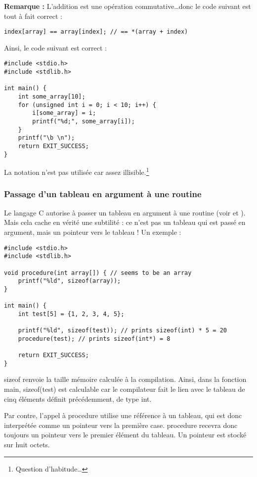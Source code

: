 \documentclass[../../../main.tex]{subfiles}
\begin{document}
\textbf{Remarque :} L'addition est une opération commutative\dots donc le code suivant est tout à fait correct :
\begin{verbatim}
index[array] == array[index]; // == *(array + index)
\end{verbatim}
Ainsi, le code suivant est correct :
\begin{verbatim}
#include <stdio.h>
#include <stdlib.h>

int main() {
	int some_array[10];
	for (unsigned int i = 0; i < 10; i++) {
		i[some_array] = i;
		printf("%d;", some_array[i]);
	}
	printf("\b \n");
	return EXIT_SUCCESS;
}
\end{verbatim}
La notation n'est pas utilisée car assez illisible.\footnote{Question d'habitude\dots}
\subsubsection{Passage d'un tableau en argument à une routine}
Le langage C autorise à passer un tableau en argument à une routine (voir  et ). Mais cela cache en vérité une subtilité : ce n'est pas un tableau qui est passé en argument, mais un pointeur vers le tableau !\newline
Un exemple :
\begin{verbatim}
#include <stdio.h>
#include <stdlib.h>

void procedure(int array[]) { // seems to be an array
	printf("%ld", sizeof(array));
}

int main() {
	int test[5] = {1, 2, 3, 4, 5};
	
	printf("%ld", sizeof(test)); // prints sizeof(int) * 5 = 20
	procedure(test); // prints sizeof(int*) = 8

	return EXIT_SUCCESS;
}
\end{verbatim}
\textsf{sizeof} renvoie la taille mémoire calculée à la compilation. Ainsi, dans la fonction \textsf{main}, \textsf{sizeof(test)} est calculable car le compilateur fait le lien avec le tableau de cinq éléments définit précédemment, de type \textsf{int}.
 
Par contre, l'appel à \textsf{procedure} utilise une référence à un tableau, qui est donc interprétée comme un pointeur vers la première case. \textsf{procedure} recevra donc toujours un pointeur vers le premier élément du tableau. Un pointeur est stocké sur huit octets.
 
\end{document}
